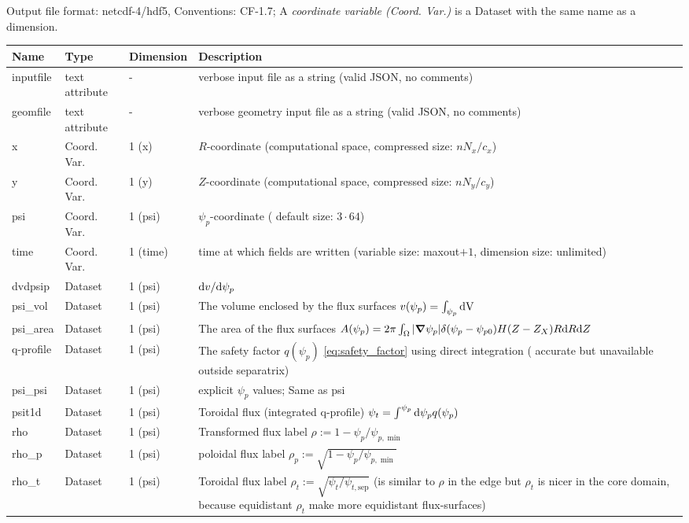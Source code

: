 Output file format: netcdf-4/hdf5, Conventions: CF-1.7; A \textit{coordinate variable (Coord. Var.)} is a Dataset with the same name as a dimension.

\begin{longtable}{lll>{\RaggedRight}p{7cm}}
\toprule
\rowcolor{gray!50}\textbf{Name} &  \textbf{Type} & \textbf{Dimension} & \textbf{Description}  \\ \midrule
inputfile  &     text attribute & - & verbose input file as a string (valid JSON, no comments) \\
geomfile   &     text attribute & - & verbose geometry input file as a string (valid JSON, no comments) \\
x                & Coord. Var. & 1 (x) & $R$-coordinate (computational space, compressed size: $nN_x/c_x$)\\
y                & Coord. Var. & 1 (y) & $Z$-coordinate (computational space, compressed size: $nN_y/c_y$)\\
psi              & Coord. Var. & 1 (psi) & $\psi_p$-coordinate ( default size: $3\cdot 64$) \\
time             & Coord. Var. & 1 (time)& time at which fields are written (variable size: maxout$+1$, dimension size: unlimited) \\
dvdpsip          & Dataset & 1 (psi) & $\mathrm{d} v/\mathrm{d}\psi_p$ \\
psi\_vol         & Dataset & 1 (psi) & The volume enclosed by the flux surfaces $v(\psi_p) = \int_{\psi_p} \mathrm{dV}\, $ \\
psi\_area        & Dataset & 1 (psi) & The area of the flux surfaces $A(\psi_p) = 2\pi \int_\Omega |{\boldsymbol{\nabla}}\psi_p| \delta(\psi_p - \psi_{p0}) H(Z-Z_X) R\mathrm{d} R\mathrm{d} Z$ \\
q-profile        & Dataset & 1 (psi) & The safety factor $q(\psi_p)$ \eqref{eq:safety_factor} using direct integration ( accurate but unavailable outside separatrix) \\
psi\_psi         & Dataset & 1 (psi) & explicit $\psi_p$ values; Same as psi \\
psit1d           & Dataset & 1 (psi) & Toroidal flux (integrated q-profile) $\psi_t = \int^{\psi_p} \mathrm{d}\psi_p q(\psi_p)$ \\
rho              & Dataset & 1 (psi) & Transformed flux label $\rho:= 1 - \psi_p/\psi_{p,\min}$ \\
rho\_p           & Dataset & 1 (psi) & poloidal flux label $\rho_p:= \sqrt{1 - \psi_p/\psi_{p,\min}}$ \\
rho\_t           & Dataset & 1 (psi) & Toroidal flux label $\rho_t := \sqrt{\psi_t/\psi_{t,\mathrm{sep}}}$ (is similar to $\rho$ in the edge but $\rho_t$ is nicer in the core domain, because equidistant $\rho_t$ make more equidistant flux-surfaces)\\

\end{longtable}
